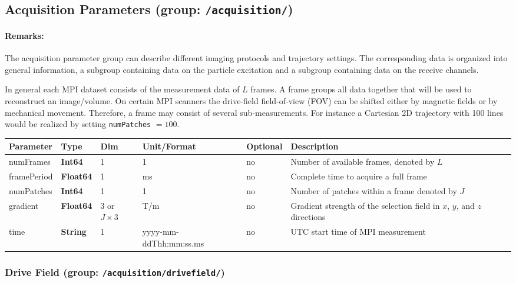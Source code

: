 \documentclass[landscape]{article} %
\newcommand{\inl}[1]{\lstinline[columns=fixed]{#1}}
\newcommand{\inltab}[1]{{\ttfamily\bfseries\color{blue}#1}}
\newcommand{\inlvar}[1]{{\ttfamily#1}}
\begin{document}
\subsection{Acquisition Parameters (group: \inl{/acquisition/})}

\begin{multicols}{2}

\paragraph{Remarks:} The acquisition parameter group can describe different imaging protocols and trajectory settings. The corresponding data is organized into general information, a subgroup containing data on the particle excitation and a subgroup containing data on the receive channels.

In general each MPI dataset consists of the measurement data of $L$ frames. A frame groups all data together that will be used to reconstruct an image/volume. On certain MPI scanners the drive-field field-of-view (FOV) can be shifted either by magnetic fields or by mechanical movement. Therefore, a frame may consist of several sub-measurements. For instance a Cartesian 2D trajectory with 100 lines would be realized by setting \inl{numPatches} $ = 100$.

\end{multicols}

\noindent \begin{tabularx}{\columnwidth}{lllllX} 
\textbf{Parameter} & \textbf{Type} & \textbf{Dim} & \textbf{Unit/Format} & \textbf{Optional} & \textbf{Description} \\ \hline 
\inlvar{numFrames} & \inltab{Int64} & 1 & 1 & no & Number of available frames, denoted by $L$ \\ \hline
\inlvar{framePeriod} & \inltab{Float64} & 1 & ms & no & Complete time to acquire a full frame \\ \hline
\inlvar{numPatches} & \inltab{Int64} & 1 & 1 & no & Number of patches within a frame denoted by $J$ \\ \hline 
\inlvar{gradient} & \inltab{Float64} & 3 or $J \times 3$ & T/m & no & Gradient strength of the selection field in $x$, $y$, and $z$ directions \\ \hline
\inlvar{time} & \inltab{String} & 1 & yyyy-mm-ddThh:mm:ss.ms & no & UTC start time of MPI measurement \\ \hline
\end{tabularx}


\subsubsection{Drive Field (group: \inl{/acquisition/drivefield/})}
\end{document}
